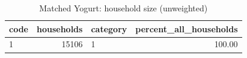 \begin{table}
\caption{Matched Yogurt: household size (unweighted)}
\begin{tabular}{lrlr}
\toprule
code & households & category & percent\_all\_households \\
\midrule
1 & 15106 & 1 & 100.00 \\
\bottomrule
\end{tabular}
\end{table}
